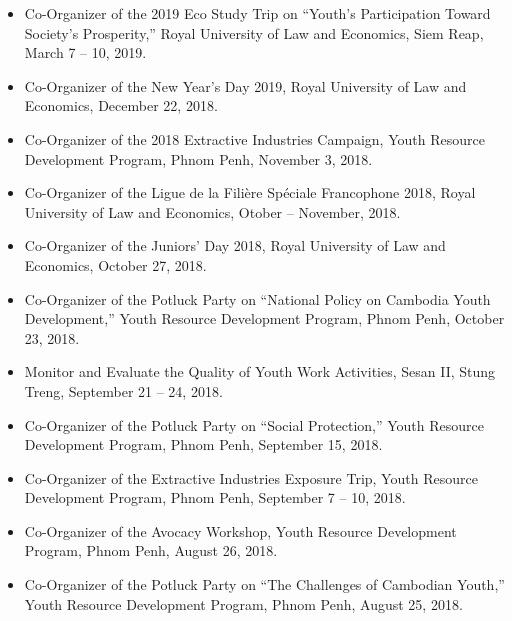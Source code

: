 \documentclass[10pt,a4paper]{article}
\begin{document}
		\vspace{0em}
		\begin{adjustwidth}{.7cm}{}
			\begin{itemize}[label={},itemindent=-2em,leftmargin=2em]
		
				\item Co-Organizer of the 2019 Eco Study Trip on “Youth's Participation Toward Society's Prosperity,'' Royal University of Law and Economics, Siem Reap, March 7 -- 10, 2019.
				
				\item Co-Organizer of the New Year's Day 2019, Royal University of Law and Economics, December 22, 2018.
				
				\item Co-Organizer of the 2018 Extractive Industries Campaign, Youth Resource Development Program, Phnom Penh, November 3, 2018. 
				
				\item Co-Organizer of the Ligue de la Filière Spéciale Francophone 2018, Royal University of Law and Economics, Otober -- November, 2018.
				
				\item Co-Organizer of the Juniors' Day 2018, Royal University of Law and Economics, October 27, 2018.
				
				\item Co-Organizer of the Potluck Party on “National Policy on Cambodia Youth Development,” Youth Resource Development Program, Phnom Penh, October 23, 2018.
				
				\item Monitor and Evaluate the Quality of Youth Work Activities, Sesan II, Stung Treng, September 21 -- 24, 2018.
				
				\item Co-Organizer of the Potluck Party on “Social Protection,” Youth Resource Development Program, Phnom Penh, September 15, 2018.
				
				\item Co-Organizer of the Extractive Industries Exposure Trip, Youth Resource Development Program, Phnom Penh, September 7 -- 10, 2018.
				
				\item Co-Organizer of the Avocacy Workshop, Youth Resource Development Program, Phnom Penh, August 26, 2018.
								
				\item Co-Organizer of the Potluck Party on “The Challenges of Cambodian Youth,” Youth Resource Development Program, Phnom Penh, August 25, 2018.
				

\end{itemize}
\end{adjustwidth}
\end{document}
